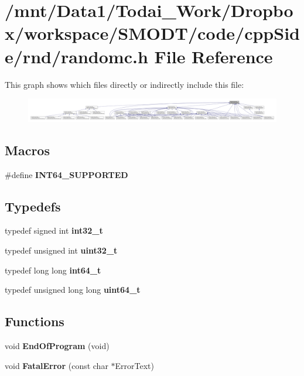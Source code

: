 \section{/mnt/\-Data1/\-Todai\-\_\-\-Work/\-Dropbox/workspace/\-S\-M\-O\-D\-T/code/cpp\-Side/rnd/randomc.h File Reference}
\label{rnd_2randomc_8h}
This graph shows which files directly or indirectly include this file\-:\nopagebreak
\begin{figure}[H]
\begin{center}
\leavevmode
\includegraphics[width=350pt]{rnd_2randomc_8h__dep__incl}
\end{center}
\end{figure}
\subsection*{Macros}
\begin{DoxyCompactItemize}
\item 
\#define {\bf I\-N\-T64\-\_\-\-S\-U\-P\-P\-O\-R\-T\-E\-D}
\end{DoxyCompactItemize}
\subsection*{Typedefs}
\begin{DoxyCompactItemize}
\item 
typedef signed int {\bf int32\-\_\-t}
\item 
typedef unsigned int {\bf uint32\-\_\-t}
\item 
typedef long long {\bf int64\-\_\-t}
\item 
typedef unsigned long long {\bf uint64\-\_\-t}
\end{DoxyCompactItemize}
\subsection*{Functions}
\begin{DoxyCompactItemize}
\item 
void {\bf End\-Of\-Program} (void)
\item 
void {\bf Fatal\-Error} (const char $\ast$Error\-Text)
\end{DoxyCompactItemize}


